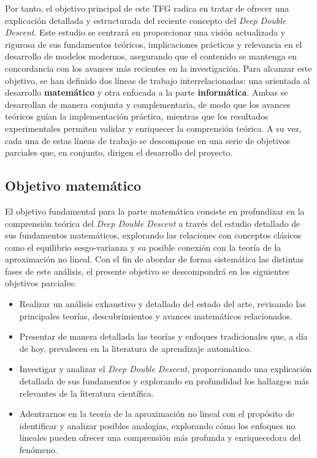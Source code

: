 Por tanto, el objetivo principal de este TFG radica en tratar de ofrecer una explicación detallada y estructurada del reciente concepto del \emph{Deep Double Descent}. Este estudio se centrará en proporcionar una visión actualizada y rigurosa de sus fundamentos teóricos, implicaciones prácticas y relevancia en el desarrollo de modelos modernos, asegurando que el contenido se mantenga en concordancia con los avances más recientes en la investigación. Para alcanzar este objetivo, se han definido dos líneas de trabajo interrelacionadas: una orientada al desarrollo \textbf{matemático} y otra enfocada a la parte \textbf{informática}. Ambas se desarrollan de manera conjunta y complementaria, de modo que los avances teóricos guían la implementación práctica, mientras que los resultados experimentales permiten validar y enriquecer la comprensión teórica. A su vez, cada una de estas líneas de trabajo se descompone en una serie de objetivos parciales que, en conjunto, dirigen el desarrollo del proyecto.

\subsection{Objetivo matemático}

El objetivo fundamental para la parte matemática consiste en profundizar en la comprensión teórica del \textit{Deep Double Descent} a través del estudio detallado de sus fundamentos matemáticos, explorando las relaciones con conceptos clásicos como el equilibrio sesgo-varianza y su posible conexión con la teoría de la aproximación no lineal. Con el fin de abordar de forma sistemática las distintas fases de este análisis, el presente objetivo se descompondrá en los siguientes objetivos parciales:

\begin{itemize}
    \item Realizar un análisis exhaustivo y detallado del estado del arte, revisando las principales teorías, descubrimientos y avances matemáticos relacionados.
    \item Presentar de manera detallada las teorías y enfoques tradicionales que, a día de hoy, prevalecen en la literatura de aprendizaje automático.
    \item Investigar y analizar el \textit{Deep Double Descent}, proporcionando una explicación detallada de sus fundamentos y explorando en profundidad los hallazgos más relevantes de la literatura científica.
    \item Adentrarnos en la teoría de la aproximación no lineal con el propósito de identificar y analizar posibles analogías, explorando cómo los enfoques no lineales pueden ofrecer una comprensión más profunda y enriquecedora del fenómeno.
\end{itemize}

